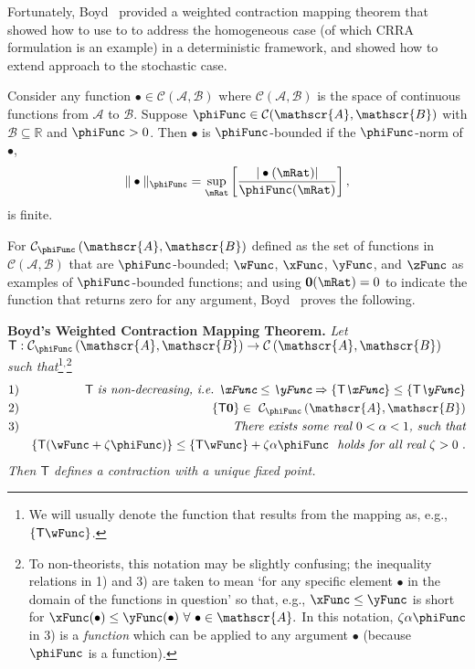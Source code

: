 \documentclass[titlepage]{\econtex}\providecommand{\texname}{BufferStockTheory}%
\begin{document}
Fortunately, Boyd~\citeyearpar{jboydWeighted} provided a weighted contraction mapping theorem that \cite{asHomogeneous} showed how to use to to address the homogeneous case (of which CRRA formulation is an example) in a deterministic framework, and \cite{duranDiscounting} showed how to extend \cite{jboydWeighted} approach to the stochastic case.
\begin{defn}
Consider any function $\bullet\in \mathcal{C}(\mathscr{A},\mathscr{B})$ where $\mathcal{C}(\mathscr{A},\mathscr{B})$ is the space of continuous functions from $\mathscr{A}$ to $%
\mathscr{B}$. Suppose $\phiFunc \in \mathcal{C}(\mathscr{A},\mathscr{B})$ with $%
\mathscr{B}\subseteq\mathbb{R}$ and $\phiFunc >0$. Then $\bullet$ is $\phiFunc$-bounded if the $\phiFunc$-norm of $\bullet$,
\begin{equation}
\Vert \bullet\Vert _{\phiFunc }=\sup_{\mRat}\left[ \frac{|\bullet(\mRat)|}{\phiFunc (\mRat)}\right] ,
\label{eq:phinorm}
\end{equation}%
is finite.
\end{defn}

For $\mathcal{C}_{\phiFunc }\left( \mathscr{A},\mathscr{B}\right) $
defined as the set of functions in
$\mathcal{C}(\mathscr{A},\mathscr{B})$ that are $\phiFunc$-bounded;
$\wFunc$, $\xFunc$, $\yFunc$, and $\zFunc$ as examples of
$\phiFunc$-bounded functions; and using $\mathbf{0}(\mRat)=0$ to
indicate the function that returns zero for any argument,
Boyd~\citeyearpar{jboydWeighted} proves the following.

\newcommand{\BoydT}{\mathsf{T}}
\newcommand{\Shrinker}{\alpha}
\textbf{Boyd's Weighted Contraction Mapping Theorem.} \textit{Let $\BoydT:\mathcal{C}_{\phiFunc }\left( \mathscr{A},\mathscr{B}\right)
\rightarrow \mathcal{C}\left( \mathscr{A},\mathscr{B}\right) $ such
that}\footnote{We will usually denote the function that results from the mapping as, e.g., $\{\BoydT\wFunc\}$.}$^,$\footnote{To non-theorists, this notation may be slightly confusing; the inequality relations in 1) and 3) are taken to mean `for any specific element $\bullet$ in the domain of the functions in question' so that, e.g., $\xFunc \leq \yFunc$ is short for $\xFunc(\bullet) \leq \yFunc(\bullet)~\forall~\bullet\in \mathscr{A}.$  In this notation, $\zeta \Shrinker \phiFunc$ in 3) is a {\it function} which can be applied to any argument $\bullet$ (because $\phiFunc$ is a function).} \nopagebreak
\begin{eqnarray*}
\mbox{1)} &&\BoydT%
\mbox{ {\it is non-decreasing, i.e.\ ${\xFunc} \leq {\yFunc}\Rightarrow
\{\BoydT{\xFunc}\} \leq \{\BoydT{\yFunc}\}$}}   \nonumber \\
\mbox{2)} && \{\BoydT\mathbf{0}\}\in ~ \mathcal{C}_{\phiFunc }\left(\mathscr{A},\mathscr{B}\right)  \notag \\
\mbox{3)}
&& \mbox{\it There exists some real $0 < \Shrinker < 1$, such that} \\
&& \{\BoydT({\wFunc} +\zeta\phiFunc )\} \leq \{\BoydT{\wFunc}\} +\zeta\Shrinker \phiFunc
\mbox{ {\it ~holds for all real $\zeta > 0$} }.
\end{eqnarray*}%
\textit{Then $\BoydT$ defines a contraction with a unique fixed point.}
\end{document}
